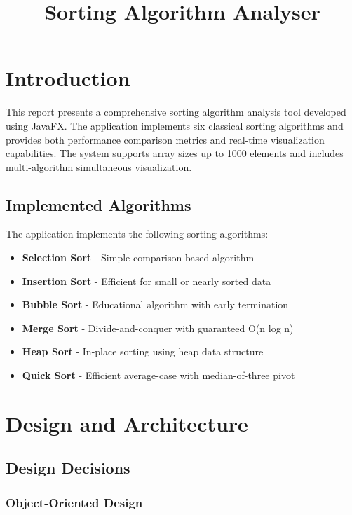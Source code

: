 \documentclass[12pt,a4paper]{article}
\title{\textbf{Sorting Algorithm Analyser}}
\author{}
\date{}
\begin{document}
\maketitle

\section{Introduction}

This report presents a comprehensive sorting algorithm analysis tool developed using JavaFX. The application implements six classical sorting algorithms and provides both performance comparison metrics and real-time visualization capabilities. The system supports array sizes up to 1000 elements and includes multi-algorithm simultaneous visualization.

\subsection{Implemented Algorithms}

The application implements the following sorting algorithms:

\begin{itemize}
    \item \textbf{Selection Sort} - Simple comparison-based algorithm
    \item \textbf{Insertion Sort} - Efficient for small or nearly sorted data
    \item \textbf{Bubble Sort} - Educational algorithm with early termination
    \item \textbf{Merge Sort} - Divide-and-conquer with guaranteed O(n log n)
    \item \textbf{Heap Sort} - In-place sorting using heap data structure
    \item \textbf{Quick Sort} - Efficient average-case with median-of-three pivot
\end{itemize}

\section{Design and Architecture}

\subsection{Design Decisions}

\subsubsection{Object-Oriented Design}
\end{document}
